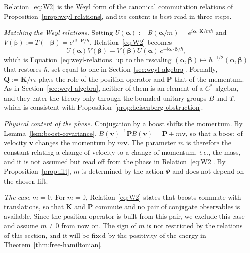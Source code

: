 \begin{remark}\label{rem:weyl}
	Relation~\eqref{eq:W2} is the Weyl form of the canonical commutation relations of Proposition~\ref{prop:weyl-relations}, and its content is best read in three steps.
	
	\emph{Matching the Weyl relations.} Setting $U(\boldsymbol{\alpha}):=B(\boldsymbol{\alpha}/m)=e^{i\boldsymbol{\alpha}\cdot\mathbf{K}/m\hbar}$ and $V(\boldsymbol{\beta}):=T(-\boldsymbol{\beta})=e^{i\boldsymbol{\beta}\cdot\mathbf{P}/\hbar}$, Relation~\eqref{eq:W2} becomes
	\begin{equation*}
		U(\boldsymbol{\alpha})V(\boldsymbol{\beta})=V(\boldsymbol{\beta})U(\boldsymbol{\alpha})\,e^{-i\boldsymbol{\alpha}\cdot\boldsymbol{\beta}/\hbar},
	\end{equation*}
	which is Equation~\eqref{eq:weyl-relations} up to the rescaling $(\boldsymbol{\alpha},\boldsymbol{\beta})\mapsto\hbar^{-1/2}(\boldsymbol{\alpha},\boldsymbol{\beta})$ that restores $\hbar$, set equal to one in Section~\ref{sec:weyl-algebra}. Formally, $\mathbf{Q}:=\mathbf{K}/m$ plays the role of the position operator and $\mathbf{P}$ that of the momentum. As in Section~\ref{sec:weyl-algebra}, neither of them is an element of a $C^*$-algebra, and they enter the theory only through the bounded unitary groups $B$ and $T$, which is consistent with Proposition~\ref{prop:heisenberg-obstruction}.
	
	\emph{Physical content of the phase.} Conjugation by a boost shifts the momentum. By Lemma~\ref{lem:boost-covariance}, $B(\mathbf{v})^{-1}\mathbf{P}B(\mathbf{v})=\mathbf{P}+m\mathbf{v}$, so that a boost of velocity $\mathbf{v}$ changes the momentum by $m\mathbf{v}$. The parameter $m$ is therefore the constant relating a change of velocity to a change of momentum, \textit{i.e.}, the mass, and it is not assumed but read off from the phase in Relation~\eqref{eq:W2}. By Proposition~\ref{prop:lift}, $m$ is determined by the action $\Phi$ and does not depend on the chosen lift.
	
	\emph{The case $m=0$.} For $m=0$, Relation~\eqref{eq:W2} states that boosts commute with translations, so that $\mathbf{K}$ and $\mathbf{P}$ commute and no pair of conjugate observables is available. Since the position operator is built from this pair, we exclude this case and assume $m\neq0$ from now on. The sign of $m$ is not restricted by the relations of this section, and it will be fixed by the positivity of the energy in Theorem~\ref{thm:free-hamiltonian}.
\end{remark}

